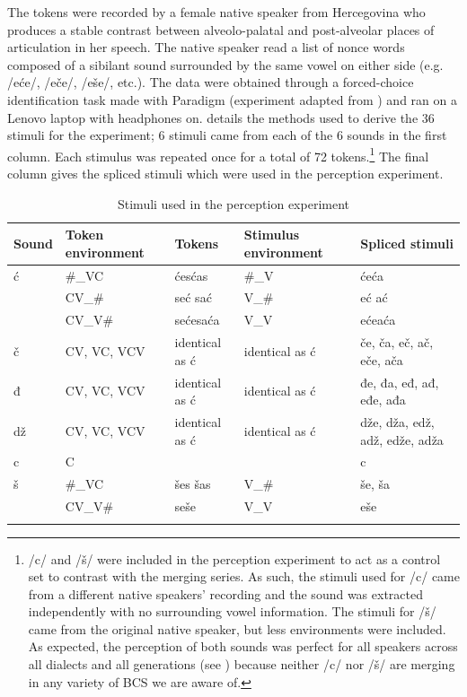\documentclass[output=paper,modfonts,newtxmath,hidelinks,]{langscibook}
\begin{document}
The tokens were recorded by a female native speaker from Hercegovina who produces a stable contrast between alveolo-palatal and post-alveolar places of articulation in her speech. The native speaker read a list of nonce words composed of a sibilant sound surrounded by the same vowel on either side (e.g. /eće/, /eče/, /eše/, etc.). The data were obtained through a forced-choice identification task made with Paradigm (experiment adapted from \citealt{Lee-Jongman2016}) and ran on a Lenovo laptop with headphones on.  details the methods used to derive the 36 stimuli for the experiment; 6 stimuli came from each of the 6 sounds in the first column. Each stimulus was repeated once for a total of 72 tokens.\footnote{/c/ and /š/ were included in the perception experiment to act as a control set to contrast with the merging series. As such, the stimuli used for /c/ came from a different native speakers' recording and the sound was extracted independently with no surrounding vowel information. The stimuli for /š/ came from the original native speaker, but less environments were included. As expected, the perception of both sounds was perfect for all speakers across all dialects and all generations (see ) because neither /c/ nor /š/ are merging in any variety of BCS we are aware of.} The final column gives the spliced stimuli which were used in the perception experiment.

\begin{table}
\begin{tabularx}{\textwidth}{llXQQ}
\lsptoprule
 \textbf{Sound} &  \textbf{Token environment} &  \textbf{Tokens} &  \textbf{Stimulus environment} &  \textbf{Spliced stimuli}\\
\midrule
{ć} & \#\_VC & {ćes}\newline ćas & \#\_V & {će}\newline ća\\
& CV\_\# & {seć} \newline sać & V\_\# & {eć} \newline  ać\\

\tablevspace 
& CV\_V\# & {seće}\newline saća & V\_V & {eće}\newline aća\\

\tablevspace
č & CV, VC, VCV & identical as ć & identical as ć & če, ča, eč, ač, eče, ača\\
{đ} & CV, VC, VCV & identical as ć & identical as ć & đe, đa, eđ, ađ, eđe, ađa\\
dž & CV, VC, VCV & identical as ć & identical as ć & dže, dža, edž, adž, edže, adža\\
c & C &  &  & c\\
{š} & \#\_VC & {šes} \newline šas & V\_\# & še, ša\\
& CV\_V\# & seše & V\_V & eše\\
\lspbottomrule
\end{tabularx}
\caption{\label{tab:mihajlovic:3} Stimuli used in the perception experiment}
\end{table}
\end{document}

